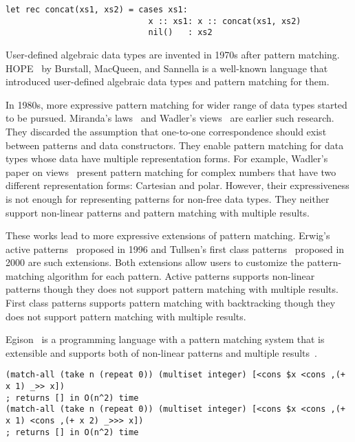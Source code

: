 \documentclass[acmlarge]{acmart}
\begin{document}
\begin{lstlisting}[language=egison]
let rec concat(xs1, xs2) = cases xs1:
                             x :: xs1: x :: concat(xs1, xs2)
                             nil()   : xs2
\end{lstlisting}

User-defined algebraic data types are invented in 1970s after pattern matching.
HOPE~\cite{burstall1980hope} by Burstall, MacQueen, and Sannella is a well-known language that introduced user-defined algebraic data types and pattern matching for them.

In 1980s, more expressive pattern matching for wider range of data types started to be pursued.
Miranda's laws~\cite{thompson1986laws,thompson1990lawful} and Wadler's views~\cite{wadler1987views} are earlier such research.
They discarded the assumption that one-to-one correspondence should exist between patterns and data constructors.
They enable pattern matching for data types whose data have multiple representation forms.
For example, Wadler's paper on views~\cite{wadler1987views} present pattern matching for complex numbers that have two different representation forms: Cartesian and polar.
However, their expressiveness is not enough for representing patterns for non-free data types.
They neither support non-linear patterns and pattern matching with multiple results.

These works lead to more expressive extensions of pattern matching.
Erwig's active patterns~\cite{erwig1996active} proposed in 1996 and Tullsen's first class patterns~\cite{tullsen2000first} proposed in 2000 are such extensions.
Both extensions allow users to customize the pattern-matching algorithm for each pattern.
Active patterns supports non-linear patterns though they does not support pattern matching with multiple results.
First class patterns supports pattern matching with backtracking though they does not support pattern matching with multiple results.

Egison~\cite{egisonWeb} is a programming language with a pattern matching system that is extensible and supports both of non-linear patterns and multiple results~\cite{egi2018aplas}.

\begin{lstlisting}[language=egison]
(match-all (take n (repeat 0)) (multiset integer) [<cons $x <cons ,(+ x 1) _>> x])
; returns [] in O(n^2) time
(match-all (take n (repeat 0)) (multiset integer) [<cons $x <cons ,(+ x 1) <cons ,(+ x 2) _>>> x])
; returns [] in O(n^2) time
\end{lstlisting}
\end{document}

